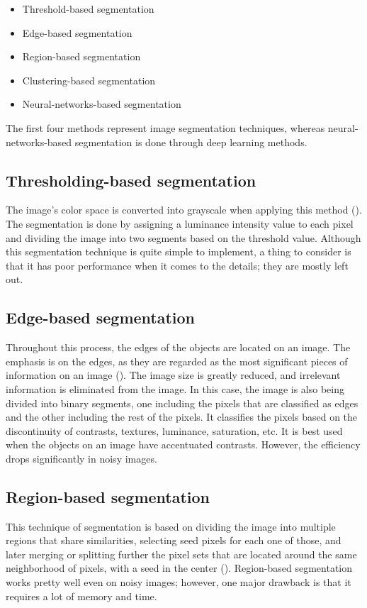 \documentclass[english]{sbrt}
\begin{document}
\begin{itemize}
\item Threshold-based segmentation
\item Edge-based segmentation
\item Region-based segmentation
\item Clustering-based segmentation
\item Neural-networks-based segmentation
\end{itemize}

\noindent The first four methods represent image segmentation techniques, whereas neural-networks-based segmentation is done through deep learning methods.

\subsection{Thresholding-based segmentation}
The image's color space is converted into grayscale when applying this method (\cite{alamri_2010_image}). The segmentation is done by assigning a luminance intensity value to each pixel and dividing the image into two segments based on the threshold value. Although this segmentation technique is quite simple to implement, a thing to consider is that it has poor performance when it comes to the details; they are mostly left out.

\subsection{Edge-based segmentation}
Throughout this process, the edges of the objects are located on an image. The emphasis is on the edges, as they are regarded as the most significant pieces of information on an image (\cite{yuheng_2017_image}). The image size is greatly reduced, and irrelevant information is eliminated from the image. In this case, the image is also being divided into binary segments, one including the pixels that are classified as edges and the other including the rest of the pixels. It classifies the pixels based on the discontinuity of contrasts, textures, luminance, saturation, etc. It is best used when the objects on an image have accentuated contrasts. However, the efficiency drops significantly in noisy images.

\subsection{Region-based segmentation}
This technique of segmentation is based on dividing the image into multiple regions that share similarities, selecting seed pixels for each one of those, and later merging or splitting further the pixel sets that are located around the same neighborhood of pixels, with a seed in the center (\cite{yuheng_2017_image}). Region-based segmentation works pretty well even on noisy images; however, one major drawback is that it requires a lot of memory and time.
\end{document}
